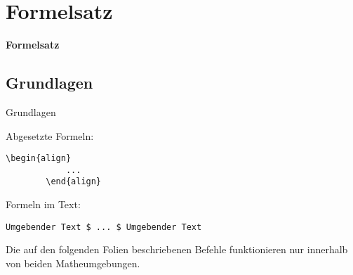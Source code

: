 \section{Formelsatz}
\begin{frame}[c]
	\begin{center}
		\LARGE \textbf{Formelsatz}
	\end{center}
\end{frame}
\subsection{Grundlagen}
\begin{frame}[c]
	\begin{center}
		\large Grundlagen
	\end{center}
\end{frame}
\begin{frame}[fragile]
	Abgesetzte Formeln:
	\begin{lstlisting}[gobble=8]
	    \begin{align}
		    ...
	    \end{align}
	\end{lstlisting}
	Formeln im Text:
	\begin{lstlisting}[gobble=8]
	    Umgebender Text $ ... $ Umgebender Text
	\end{lstlisting}
	
	Die auf den folgenden Folien beschriebenen Befehle funktionieren nur innerhalb von beiden Matheumgebungen.
\end{frame}
